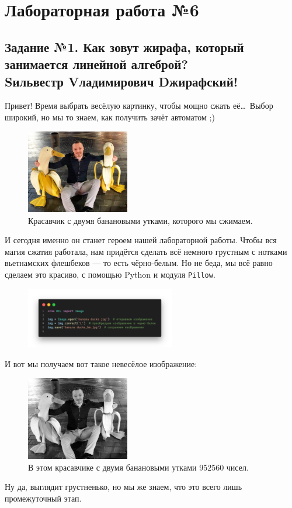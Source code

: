 \documentclass[a3paper,14pt]{extarticle}
\begin{document}
\section*{\centering Лабораторная работа №6}
\subsection*{\centering Задание №1. Как зовут жирафа, который занимается линейной алгеброй? \\ Sильвестр Vладимирович Dжирафский!}
Привет! Время выбрать весёлую картинку, чтобы мощно сжать её\dots\ Выбор широкий, но мы то знаем, как получить зачёт автоматом ;)
\begin{figure}[H]
    \centering\includegraphics[width=0.4\textwidth]{banana ducks.jpg}
    \caption{Красавчик с двумя банановыми утками, которого мы сжимаем.}
\end{figure} \noindent
И сегодня именно он станет героем нашей лабораторной работы. Чтобы вся магия сжатия работала, нам придётся сделать всё немного грустным с нотками вьетнамских флешбеков --- то есть чёрно-белым. Но не беда, мы всё равно сделаем это красиво, с помощью Python и модуля \texttt{Pillow}.
\begin{figure}[H]
    \centering\includegraphics[width=0.58\textwidth]{code1.png}
\end{figure} \noindent
И вот мы получаем вот такое невесёлое изображение:
\begin{figure}[H]
    \centering\includegraphics[width=0.4\textwidth]{banana ducks_bw.jpg}
    \caption{В этом красавчике с двумя банановыми утками 952560 чисел.}
\end{figure} \noindent
Ну да, выглядит грустненько, но мы же знаем, что это всего лишь промежуточный этап.
\end{document}
